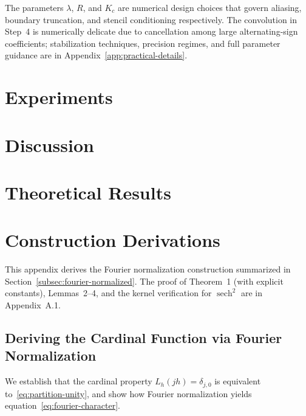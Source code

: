 \documentclass{article}
\begin{document}
The parameters \(\lambda\), \(R\), and \(K_c\) are numerical design choices that govern aliasing, boundary truncation, and stencil conditioning respectively.  The convolution in Step~4 is numerically delicate due to cancellation among large alternating-sign coefficients; stabilization techniques, precision regimes, and full parameter guidance are in Appendix~\ref{app:practical-details}.



\section{Experiments}

\section{Discussion}

\medskip
\small




\appendix

\section{Theoretical Results}


\section{Construction Derivations}
\label{app:construction-derivations}

This appendix derives the Fourier normalization construction summarized in Section~\ref{subsec:fourier-normalized}.  The proof of Theorem~1 (with explicit constants), Lemmas~2--4, and the kernel verification for \(\operatorname{sech}^2\) are in Appendix~A.1.

\subsection{Deriving the Cardinal Function via Fourier Normalization}
\label{app:fourier-normalization}

We establish that the cardinal property \(L_h(jh) = \delta_{j,0}\) is equivalent to~\eqref{eq:partition-unity}, and show how Fourier normalization yields equation~\eqref{eq:fourier-character}.
\end{document}
